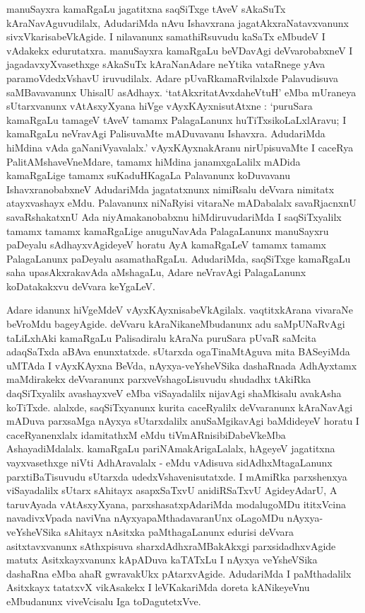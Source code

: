 manuSayxra kamaRgaLu jagatitxna saqSiTxge tAveV sAkaSuTx kAraNavAguvudilalx, AdudariMda nAvu Ishavxrana jagatAkxraNatavxvanunx sivxVkarisabeVkAgide. I nilavanunx samathiRsuvudu kaSaTx eMbudeV I vAdakekx edurutatxra. manuSayxra kamaRgaLu beVDavAgi deVvarobabxneV I jagadavxyXvasethxge sAkaSuTx kAraNanAdare neYtika vataRnege yAva paramoVdedxVshavU iruvudilalx. Adare pUvaRkamaRvilalxde Palavudisuva saMBavavanunx UhisalU asAdhayx. `tatAkxritatAvxdaheVtuH' eMba mUraneya sUtarxvanunx vAtAsxyXyana hiVge vAyxKAyxnisutAtxne : `puruSara kamaRgaLu tamageV tAveV tamamx PalagaLanunx huTiTxsikoLaLxlAravu; I kamaRgaLu neVravAgi PalisuvaMte mADuvavanu Ishavxra. AdudariMda hiMdina vAda gaNaniVyavalalx.' vAyxKAyxnakAranu nirUpisuvaMte I caceRya PalitAMshaveVneMdare, tamamx hiMdina janamxgaLalilx mADida kamaRgaLige tamamx suKaduHKagaLa Palavanunx koDuvavanu IshavxranobabxneV AdudariMda jagatatxnunx nimiRsalu deVvara nimitatx atayxvashayx eMdu. Palavanunx niNaRyisi vitaraNe mADabalalx savaRjacnxnU savaRshakatxnU Ada niyAmakanobabxnu hiMdiruvudariMda I saqSiTxyalilx tamamx tamamx kamaRgaLige anuguNavAda PalagaLanunx manuSayxru paDeyalu sAdhayxvAgideyeV horatu AyA kamaRgaLeV tamamx tamamx PalagaLanunx paDeyalu asamathaRgaLu. AdudariMda, saqSiTxge kamaRgaLu saha upasAkxrakavAda aMshagaLu, Adare neVravAgi PalagaLanunx koDatakakxvu deVvara keYgaLeV.

Adare idanunx hiVgeMdeV vAyxKAyxnisabeVkAgilalx. vaqtitxkArana vivaraNe beVroMdu bageyAgide. deVvaru kAraNikaneMbudanunx adu saMpUNaRvAgi taLiLxhAki kamaRgaLu Palisadiralu kAraNa puruSara pUvaR saMcita adaqSaTxda aBAva enunxtatxde. sUtarxda ogaTinaMtAguva mita BASeyiMda uMTAda I vAyxKAyxna BeVda, nAyxya-veYsheVSika dashaRnada AdhAyxtamx maMdirakekx deVvaranunx parxveVshagoLisuvudu shudadhx tAkiRka daqSiTxyalilx avashayxveV eMba viSayadalilx nijavAgi shaMkisalu avakAsha koTiTxde. alalxde, saqSiTxyanunx kurita caceRyalilx deVvaranunx kAraNavAgi mADuva parxsaMga nAyxya sUtarxdalilx anuSaMgikavAgi baMdideyeV horatu I caceRyanenxlalx idamitathxM eMdu tiVmARnisibiDabeVkeMba AshayadiMdalalx. kamaRgaLu pariNAmakArigaLalalx, hAgeyeV jagatitxna vayxvasethxge niVti AdhAravalalx - eMdu vAdisuva sidAdhxMtagaLanunx parxtiBaTisuvudu sUtarxda udedxVshavenisutatxde. I mAmiRka parxshenxya viSayadalilx sUtarx sAhitayx asapxSaTxvU anidiRSaTxvU AgideyAdarU, A taruvAyada vAtAsxyXyana, parxshasatxpAdariMda modalugoMDu ititxVcina navadivxVpada naviVna nAyxyapaMthadavaranUnx oLagoMDu nAyxya-veYsheVSika sAhitayx nAsitxka paMthagaLanunx edurisi deVvara asitxtavxvanunx sAthxpisuva sharxdAdhxraMBakAkxgi parxsidadhxvAgide matutx Asitxkayxvanunx kApADuva kaTATxLu I nAyxya veYsheVSika dashaRna eMba ahaR gwravakUkx pAtarxvAgide. AdudariMda I paMthadalilx Asitxkayx tatatxvX vikAsakekx I leVKakariMda doreta kANikeyeVnu eMbudanunx viveVcisalu Iga toDagutetxVve.

